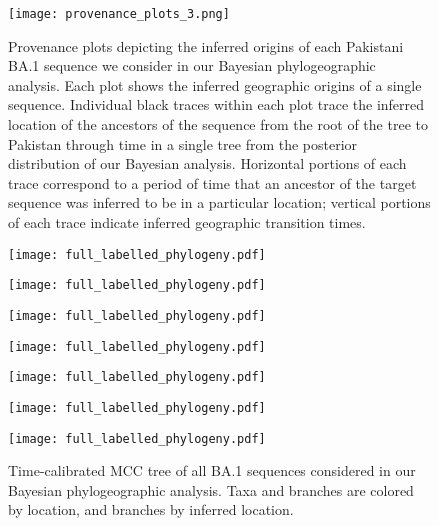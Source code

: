 \begin{figure}[!htbp]%
    \centering
    \texttt{[image: provenance\_plots\_3.png]}
    \caption[provenance plot 4]{Provenance plots depicting the inferred origins of each Pakistani BA.1 sequence we consider in our Bayesian phylogeographic analysis. Each plot shows the inferred geographic origins of a single sequence. Individual black traces within each plot trace the inferred location of the ancestors of the sequence from the root of the tree to Pakistan through time in a single tree from the posterior distribution of our Bayesian analysis. Horizontal portions of each trace correspond to a period of time that an ancestor of the target sequence was inferred to be in a particular location; vertical portions of each trace indicate inferred geographic transition times.}
    \label{sfig:prov3}
\end{figure}

\newpage
\begin{figure}[!ht]%
    \centering
    \texttt{[image: full\_labelled\_phylogeny.pdf]}
\end{figure}
\newpage
\begin{figure}[!ht]%
    \centering
    \texttt{[image: full\_labelled\_phylogeny.pdf]}
\end{figure}
\newpage
\begin{figure}[!ht]%
    \centering
    \texttt{[image: full\_labelled\_phylogeny.pdf]}
\end{figure}
\newpage
\begin{figure}[!ht]%
    \centering
    \texttt{[image: full\_labelled\_phylogeny.pdf]}
\end{figure}
\newpage
\begin{figure}[!ht]%
    \centering
    \texttt{[image: full\_labelled\_phylogeny.pdf]}
\end{figure}
\newpage
\begin{figure}[!ht]%
    \centering
    \texttt{[image: full\_labelled\_phylogeny.pdf]}
\end{figure}
\newpage
\begin{figure}[!ht]%
    \centering
    \texttt{[image: full\_labelled\_phylogeny.pdf]}
    \caption{Time-calibrated MCC tree of all BA.1 sequences considered in our Bayesian phylogeographic analysis. Taxa and branches are colored by location, and branches by inferred location.}
    \label{sfig:fullPKTree}
\end{figure}

\cleardoublepage

